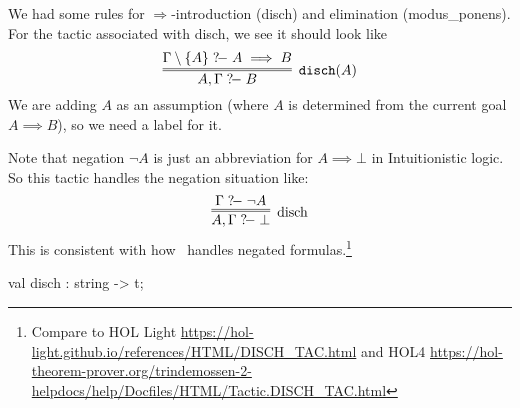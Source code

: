 \begin{node}
We had some rules for $\Longrightarrow$-introduction ({\Tt{}disch\nwendquote}) and
elimination ({\Tt{}modus{\_}ponens\nwendquote}). For the tactic associated with
{\Tt{}disch\nwendquote}, we see it should look like
\begin{equation}
\vcenter{\infer=[\texttt{disch}(A)]{A,\Gamma\gdash B}{\Gamma\setminus\{A\}\gdash A\implies B}}
\end{equation}
We are adding $A$ as an assumption (where $A$ is determined from the
current goal $A\implies B$), so we need a label for it.

Note that negation $\neg A$ is just an abbreviation for
$A\implies\bot$ in Intuitionistic logic. So this tactic handles the
negation situation like:
\begin{equation}
\vcenter{\infer=[\mbox{disch}]{A,\Gamma\gdash\bot}{\Gamma\gdash\neg A}}
\end{equation}
This is consistent with how \HOL\ handles negated
formulas.\footnote{Compare to HOL Light \url{https://hol-light.github.io/references/HTML/DISCH_TAC.html}
and HOL4 \url{https://hol-theorem-prover.org/trindemossen-2-helpdocs/help/Docfiles/HTML/Tactic.DISCH_TAC.html}}
\end{node}

\nwenddocs{}\plusendmoddef\nwstartdeflinemarkup{}\nwenddeflinemarkup
val disch : string -> t;
\nwendcode{}\nwdocspar

